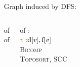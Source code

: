 
\begin{frame} 
  \centerline{\large Graph  induced by DFS:}

  \vspace{0.50cm}
  \begin{columns}
      \begin{center}
	 of  \\[15pt]

	 of 
      \end{center}
    \pause
      \begin{center}
	 of : \\[15pt]

	$\textcolor{brown}{v:} \text{d}[v], \text{f}[v]$ \\[10pt]

	 \textsc{Bicomp} \\[10pt]

	 \textsc{Toposort}, \textsc{SCC}
      \end{center}
  \end{columns}
\end{frame}

